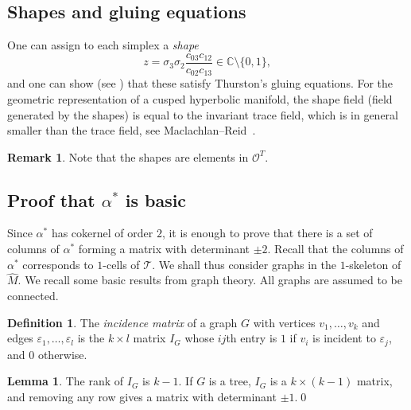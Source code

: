 \documentclass[12pt]{amsart}
\theoremstyle{definition}
\newtheorem{lemma}[theorem]{Lemma}
\newtheorem{definition}[theorem]{Definition}
\newtheorem{remark}[theorem]{Remark}
\numberwithin{equation}{section}
\def\C{\mathbb{C}}
\def\T{\mathcal{T}}
\begin{document}
\subsection{Shapes and gluing equations}
One can assign to each simplex a \emph{shape}
\begin{equation}
z=\sigma_3\sigma_2\frac{c_{03}c_{12}}{c_{02}c_{13}}\in\C\setminus\{0,1\},
\end{equation}
and one can show (see \cite{GaroufalidisThurstonZickert,GaroufalidisGoernerZickert}) that these satisfy Thurston's gluing equations.
For the geometric representation of a cusped hyperbolic manifold, the shape field (field generated by the shapes) is equal to the invariant trace field, which is in general smaller than the trace field, see Maclachlan--Reid~\cite{MaclachlanReid}.
\begin{remark}
Note that the shapes are elements in $\mathcal O^T$.
\end{remark}


\subsection{Proof that $\alpha^*$ is basic}\label{sec:AlphaStarBasic}
Since $\alpha^*$ has cokernel of order $2$, it is enough to prove that there is a set of columns of $\alpha^*$ forming a matrix with determinant $\pm 2$.
Recall that the columns of $\alpha^*$ corresponds to $1$-cells of $\T$. We shall thus consider graphs in the $1$-skeleton of $\widehat M$. We recall some basic results from graph theory. All graphs are assumed to be connected.
\begin{definition}
The \emph{incidence matrix} of a graph $G$ with vertices $v_1,\dots,v_k$ and edges $\varepsilon_1,\dots,\varepsilon_l$ is the $k\times l$ matrix $I_G$
whose $ij$th entry is $1$ if $v_i$ is incident to $\varepsilon_j$, and $0$ otherwise.
\end{definition}

\begin{lemma}\label{lemma:IncidenceMatrix}
The rank of $I_G$ is $k-1$. If $G$ is a tree, $I_G$ is a $k\times (k-1)$ matrix, and removing any row gives a matrix with determinant $\pm 1$.\qed
\end{lemma}
\end{document}
